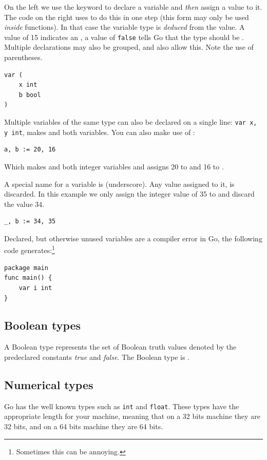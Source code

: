 On the left we use the
 keyword to declare a variable and \emph{then} assign a value to
it. The code on the right uses \mbox{\key{:=}{ }} to do this in one
step (this form may only be used \emph{inside} functions).
In that case the variable
type is \emph{deduced} from the value. A value of 15 indicates an ,
a value of \texttt{false} tells Go that the type should be . 
Multiple  declarations may also be grouped, 
and  also allow this. Note the use of parentheses.
\begin{lstlisting}
var (
    x int
    b bool
)
\end{lstlisting}
Multiple variables of the same type can also be declared on a
single line: \lstinline{var x, y int}, makes  and  both
 variables. You can also make use of :
\begin{lstlisting}
a, b := 20, 16
\end{lstlisting}
Which makes  and  both integer variables and assigns
20 to  and 16 to .

A special name for a variable is \var{\_} (underscore). Any value
assigned to it, is discarded. In this example we only assign the integer
value of 35 to  and discard the value 34.
\begin{lstlisting}
_, b := 34, 35
\end{lstlisting}
Declared, but otherwise unused variables are a compiler error in Go, the
following code generates:\footnote{Sometimes this can be annoying.}
\begin{lstlisting}
package main
func main() { 
    var i int
}
\end{lstlisting}

\subsection{Boolean types}
A Boolean type represents the set of Boolean truth values denoted by the
predeclared constants \emph{true} and \emph{false}. The Boolean type is .

\subsection{Numerical types}
Go has the well known types such as \lstinline{int} and
\lstinline{float}. These types have the appropriate length for your
machine, meaning that on a 32 bits machine they are 32 bits, and on
a 64 bits machine they are 64 bits.

